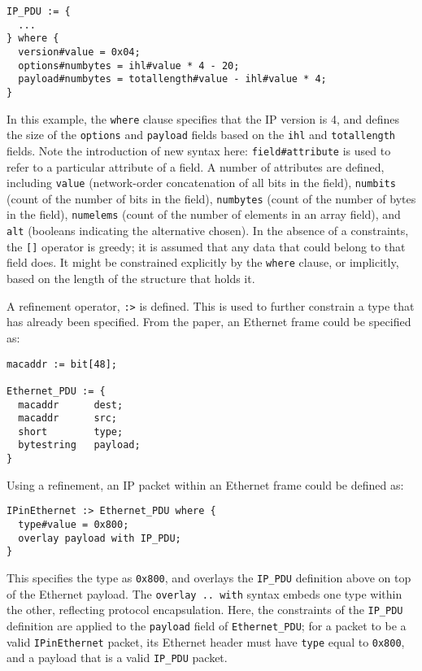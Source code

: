 \documentclass[10pt]{article}
\begin{document}
\begin{verbatim}
IP_PDU := {
  ...
} where {
  version#value = 0x04;
  options#numbytes = ihl#value * 4 - 20;
  payload#numbytes = totallength#value - ihl#value * 4;
}
\end{verbatim}

In this example, the \texttt{where} clause specifies that the IP version is 4, and defines
the size of the \texttt{options} and \texttt{payload} fields based on the \texttt{ihl}
and \texttt{totallength} fields. Note the introduction of new syntax here:
\texttt{field\#attribute} is used to refer to a particular attribute of a field. A number
of attributes are defined, including \texttt{value} (network-order concatenation of all
bits in the field), \texttt{numbits} (count of the number of bits in the field),
\texttt{numbytes} (count of the number of bytes in the field), \texttt{numelems} (count
of the number of elements in an array field), and \texttt{alt} (booleans indicating the
alternative chosen). In the absence of a constraints, the \texttt{[]} operator is greedy;
it is assumed that any data that could belong to that field does. It might be constrained
explicitly by the \texttt{where} clause, or implicitly, based on the length of the
structure that holds it.

A refinement operator, \texttt{:>} is defined. This is used to further constrain a type
that has already been specified. From the paper, an Ethernet frame could be specified as:

\begin{verbatim}
macaddr := bit[48];

Ethernet_PDU := {
  macaddr      dest;
  macaddr      src;
  short        type;
  bytestring   payload;
}
\end{verbatim}

Using a refinement, an IP packet within an Ethernet frame could be defined as:

\begin{verbatim}
IPinEthernet :> Ethernet_PDU where {
  type#value = 0x800;
  overlay payload with IP_PDU;
}
\end{verbatim}

This specifies the type as \texttt{0x800}, and overlays the \texttt{IP\_PDU} definition
above on top of the Ethernet payload. The \texttt{overlay .. with} syntax embeds one type
within the other, reflecting protocol encapsulation. Here, the constraints of the
\texttt{IP\_PDU} definition are applied to the \texttt{payload} field of
\texttt{Ethernet\_PDU}; for a packet to be a valid \texttt{IPinEthernet} packet, its
Ethernet header must have \texttt{type} equal to \texttt{0x800}, and a payload that is a
valid \texttt{IP\_PDU} packet.
\end{document}
